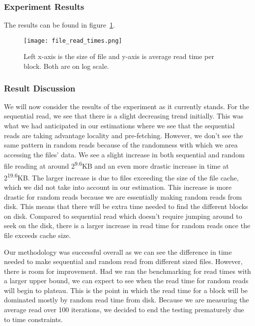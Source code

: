 \documentclass{article} %
\begin{document}
\subsubsection{Experiment Results}

The results can be found in figure~\ref{fig:file_read_times}.

\begin{figure}[!htb]
\centering
\texttt{[image: file\_read\_times.png]}
\caption{Left x-axis is the size of file and y-axis is average read time per block. Both are on log scale.}
\label{fig:file_read_times}
\end{figure}


\subsubsection{Result Discussion}
We will now consider the results of the experiment as it currently stands. For the sequential read, we see that there is a slight decreasing trend initially. This was what we had anticipated in our estimations where we see that the sequential reads are taking advantage locality and pre-fetching. However, we don't see the same pattern in random reads because of the randomness with which we area accessing the files' data. We see a slight increase in both sequential and random file reading at around 2\textsuperscript{9.6}KB and an even more drastic increase in time at 2\textsuperscript{19.6}KB. The larger increase is due to files exceeding the size of the file cache, which we did not take into account in our estimation. This increase is more drastic for random reads because we are essentially making random reads from disk. This means that there will be extra time needed to find the different blocks on disk. Compared to sequential read which doesn't require jumping around to seek on the disk, there is a larger increase in read time for random reads once the file exceeds cache size.

Our methodology was successful overall as we can see the difference in time needed to make sequential and random read from different sized files. However, there is room for improvement. Had we ran the benchmarking for read times with a larger upper bound, we can expect to see when the read time for random reads will begin to plateau. This is the point in which the read time for a block will be dominated mostly by random read time from disk. Because we are measuring the average read over 100 iterations, we decided to end the testing prematurely due to time constraints. 
\end{document}
